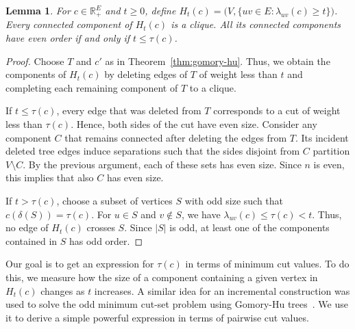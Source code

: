 \documentclass[centering,11pt,reqno]{amsart}
\newtheorem{lem}[theorem]{Lemma}
\theoremstyle{definition}
\newcommand{\R}{\mathbb{R}}
\def\R{\mathbb{R}}
\begin{document}
\begin{lem}\label{lem:odd-threshold-components}
    For $c\in\R_+^E$ and $t\ge0$, define $H_t(c)=\bigl(V,\{uv\in E:\lambda_{uv}(c)\ge t\}\bigr)$.
    Every connected component of $H_t(c)$ is a clique.
    All its connected components have even order if and only if $t\le\tau(c)$.
\end{lem}
\begin{proof}
    Choose $T$ and $c'$ as in Theorem~\ref{thm:gomory-hu}.
    Thus, we obtain the components of $H_t(c)$ by deleting edges of $T$ of weight less than $t$ and completing each remaining component of $T$ to a clique.

    If $t\le\tau(c)$, every edge that was deleted from $T$ corresponds to a cut of weight less than $\tau(c)$.
    Hence, both sides of the cut have even size.
    Consider any component $C$ that remains connected after deleting the edges from $T$.
    Its incident deleted tree edges induce separations such that the sides disjoint from $C$ partition $V\setminus C$.
    By the previous argument, each of these sets has even size.
    Since $n$ is even, this implies that also $C$ has even size.

    If $t>\tau(c)$, choose a subset of vertices $S$ with odd size such that $c(\delta(S))=\tau(c)$.
    For $u\in S$ and $v\notin S$, we have $\lambda_{uv}(c)\le\tau(c)<t$.
    Thus, no edge of $H_t(c)$ crosses $S$.
    Since $|S|$ is odd, at least one of the components contained in $S$ has odd order.
\end{proof}

Our goal is to get an expression for $\tau(c)$ in terms of minimum cut values. 
To do this, we measure how the size of a component containing a given vertex in $H_{t}(c)$ changes as $t$ increases. 
A similar idea for an incremental construction was used to solve the odd minimum cut-set problem using Gomory-Hu trees~\cite{PadbergRao:1982}. 
We use it to derive a simple powerful expression in terms of pairwise cut values. 
\end{document}
